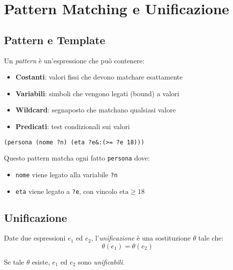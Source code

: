 \section{Pattern Matching e Unificazione}

\subsection{Pattern e Template}

Un \textit{pattern} è un'espressione che può contenere:

\begin{itemize}
\item \textbf{Costanti}: valori fissi che devono matchare esattamente
\item \textbf{Variabili}: simboli che vengono legati (bound) a valori
\item \textbf{Wildcard}: segnaposto che matchano qualsiasi valore
\item \textbf{Predicati}: test condizionali sui valori
\end{itemize}

\begin{esempio}
\begin{lstlisting}[language=CLIPS]
(persona (nome ?n) (eta ?e&:(>= ?e 18)))
\end{lstlisting}

Questo pattern matcha ogni fatto \texttt{persona} dove:
\begin{itemize}
\item \texttt{nome} viene legato alla variabile \texttt{?n}
\item \texttt{eta} viene legato a \texttt{?e}, con vincolo $\text{eta} \geq 18$
\end{itemize}
\end{esempio}

\subsection{Unificazione}

\begin{definizione}[Unificazione]
Date due espressioni $e_1$ ed $e_2$, l'\textit{unificazione} è una sostituzione $\theta$ tale che:
\begin{equation}
\theta(e_1) = \theta(e_2)
\end{equation}

Se tale $\theta$ esiste, $e_1$ ed $e_2$ sono \textit{unificabili}.
\end{definizione}

